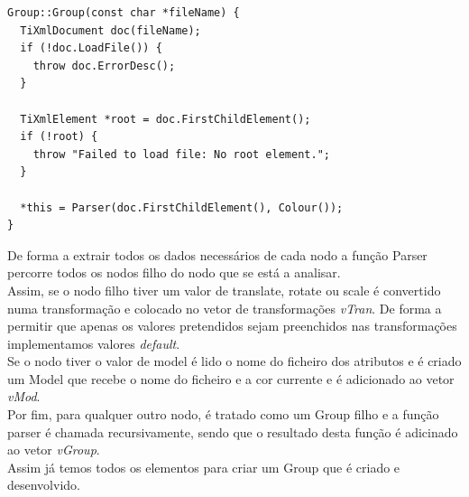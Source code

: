 \documentclass[a4paper]{report}
\begin{document}
\begin{lstlisting}
Group::Group(const char *fileName) {
  TiXmlDocument doc(fileName);
  if (!doc.LoadFile()) {
    throw doc.ErrorDesc();
  }

  TiXmlElement *root = doc.FirstChildElement();
  if (!root) {
    throw "Failed to load file: No root element.";
  }

  *this = Parser(doc.FirstChildElement(), Colour());
}
\end{lstlisting}
De forma a extrair todos os dados necessários de cada nodo a função Parser
percorre todos os nodos filho do nodo que se está a analisar.\\
Assim, se o nodo filho tiver um valor de translate, rotate ou scale é convertido
numa transformação e colocado no vetor de transformações \textit{vTran}. De
forma a permitir que apenas os valores pretendidos sejam preenchidos nas
transformações implementamos valores \textit{default}.\\
Se o nodo tiver o valor de model é lido o nome do ficheiro dos atributos e é
criado um Model que recebe o nome do ficheiro e a cor currente e é adicionado ao
vetor \textit{vMod}.\\
Por fim, para qualquer outro nodo, é tratado como um Group filho e a função
parser é chamada recursivamente, sendo que o resultado desta função é adicinado
ao vetor \textit{vGroup}.\\
Assim já temos todos os elementos para criar um Group que é criado e
desenvolvido.
\end{document}
